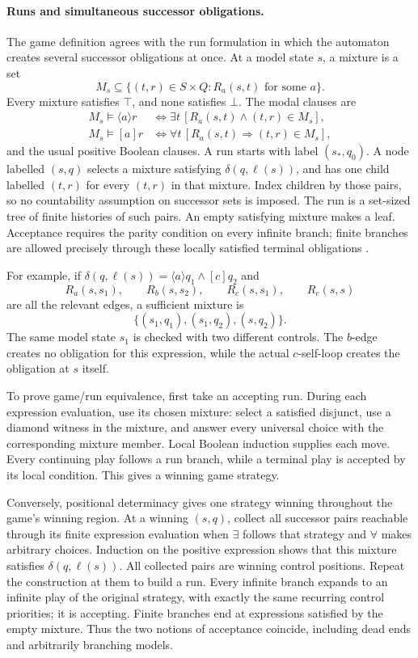 \paragraph{Runs and simultaneous successor obligations.}
The game definition agrees with the run formulation
in which the automaton creates several successor
obligations at once. At a model state \(s\),
a mixture is a set
\[
 M_s\subseteq
 \{(t,r)\in S\times Q:
                   R_a(s,t)\text{ for some }a\}.
\]
Every mixture satisfies \(\top\), and none satisfies
\(\bot\). The modal clauses are
\[
\begin{aligned}
 M_s\models\langle a\rangle r
   &\iff\exists t\,[R_a(s,t)\land(t,r)\in M_s],\\
 M_s\models[a]r
   &\iff\forall t\,[R_a(s,t)\Rightarrow(t,r)\in M_s],
\end{aligned}
\]
and the usual positive Boolean clauses.
A run starts with label \((s_*,q_0)\).
A node labelled \((s,q)\) selects a mixture
satisfying \(\delta(q,\ell(s))\), and has
one child labelled \((t,r)\) for every
\((t,r)\) in that mixture.
Index children by those pairs, so no
countability assumption on successor sets
is imposed. The run is a set-sized tree
of finite histories of such pairs.
An empty satisfying mixture makes a leaf.
Acceptance requires the parity condition
on every infinite branch; finite branches
are allowed precisely through these
locally satisfied terminal obligations
\cite[\S5.3]{BradfieldStirling2007}.

For example, if
\(\delta(q,\ell(s))=\langle a\rangle q_1
                         \land[c]q_2\)
and
\[
 R_a(s,s_1),\qquad R_b(s,s_2),\qquad
 R_c(s,s_1),\qquad R_c(s,s)
\]
are all the relevant edges, a sufficient
mixture is
\[
 \{(s_1,q_1),(s_1,q_2),(s,q_2)\}.
\]
The same model state \(s_1\) is checked
with two different controls. The \(b\)-edge
creates no obligation for this expression,
while the actual \(c\)-self-loop creates
the obligation at \(s\) itself.

To prove game/run equivalence, first take
an accepting run. During each expression
evaluation, use its chosen mixture:
select a satisfied disjunct, use a
diamond witness in the mixture, and
answer every universal choice with the
corresponding mixture member. Local
Boolean induction supplies each move.
Every continuing play follows a run
branch, while a terminal play is
accepted by its local condition.
This gives a winning game strategy.

Conversely, positional determinacy gives
one strategy winning throughout the
game's winning region. At a winning
\((s,q)\), collect all successor pairs
reachable through its finite expression
evaluation when \(\exists\) follows
that strategy and \(\forall\) makes
arbitrary choices. Induction on the
positive expression shows that this
mixture satisfies \(\delta(q,\ell(s))\).
All collected pairs are winning control
positions. Repeat the construction at
them to build a run.
Every infinite branch expands to an
infinite play of the original strategy,
with exactly the same recurring control
priorities; it is accepting. Finite
branches end at expressions satisfied
by the empty mixture.
Thus the two notions of acceptance
coincide, including dead ends and
arbitrarily branching models.

